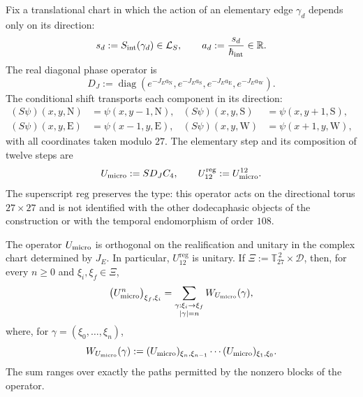 Fix a translational chart in which the action of an elementary edge
\(\gamma_d\) depends only on its direction:
\[
 s_d:=S_{\rm int}(\gamma_d)\in\mathcal L_S,
 \qquad
 a_d:=\frac{s_d}{\hbar_{\rm int}}\in\mathbb R.
\]
The real diagonal phase operator is
\[
 D_J:=\operatorname{diag}
 \left(
  e^{-J_Ea_{\mathrm N}},
  e^{-J_Ea_{\mathrm S}},
  e^{-J_Ea_{\mathrm E}},
  e^{-J_Ea_{\mathrm W}}
 \right).
\]
The conditional shift transports each component in its direction:
\begin{align*}
 (S\psi)(x,y,\mathrm N)&=\psi(x,y-1,\mathrm N),&
 (S\psi)(x,y,\mathrm S)&=\psi(x,y+1,\mathrm S),\\
 (S\psi)(x,y,\mathrm E)&=\psi(x-1,y,\mathrm E),&
 (S\psi)(x,y,\mathrm W)&=\psi(x+1,y,\mathrm W),
\end{align*}
with all coordinates taken modulo \(27\). The elementary step and its
composition of twelve steps are
\begin{equation}
 U_{\rm micro}:=S D_J C_4,
 \qquad
 U_{12}^{\mathrm{reg}}:=U_{\rm micro}^{12}.
 \label{x_reciprocidad:eq:paso-unitario-registro-27-rev3}
\end{equation}
The superscript \(\mathrm{reg}\) preserves the type: this operator acts on
the directional torus \(27\times27\) and is not identified with the other
dodecaphasic objects of the construction or with the temporal endomorphism of order \(108\).

\begin{proposition}
\label{x_reciprocidad:prop:unitariedad-suma-registro-27-rev3}
The operator \(U_{\rm micro}\) is orthogonal on the realification and unitary
in the complex chart determined by \(J_E\). In particular,
\(U_{12}^{\mathrm{reg}}\) is unitary. If
\(\Xi:=\mathbb T_{27}^{\,2}\times\mathcal D\), then, for every
\(n\geq0\) and \(\xi_i,\xi_f\in\Xi\),
\[
 \bigl(U_{\rm micro}^{n}\bigr)_{\xi_f,\xi_i}
 =
 \sum_{\substack{\gamma:\xi_i\to\xi_f\\|\gamma|=n}}
 W_{U_{\rm micro}}(\gamma),
\]
where, for \(\gamma=(\xi_0,\ldots,\xi_n)\),
\[
 W_{U_{\rm micro}}(\gamma)
 :=
 (U_{\rm micro})_{\xi_n,\xi_{n-1}}
 \cdots
 (U_{\rm micro})_{\xi_1,\xi_0}.
\]
The sum ranges over exactly the paths permitted by the nonzero blocks
of the operator.
\end{proposition}

